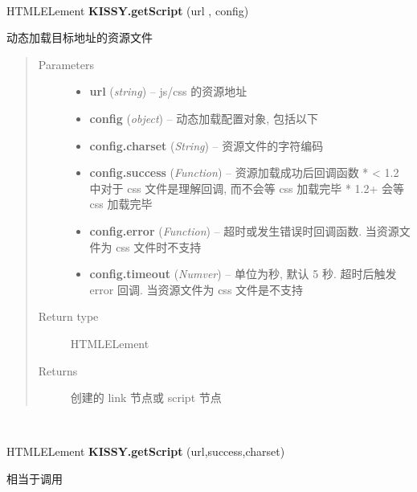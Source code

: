 \documentclass[letterpaper,10pt,english]{sphinxmanual}
\begin{document}
\begin{fulllineitems}
\label{api/seed/loader/getScript:Loader.KISSY.getScript}~
\begin{DUlineblock}{0em}
\item[] HTMLELement \textbf{KISSY.getScript} (url , config)
\item[] 动态加载目标地址的资源文件
\end{DUlineblock}
\begin{quote}\begin{description}
\item[{Parameters}] \leavevmode\begin{itemize}
\item {}
\textbf{url} (\emph{string}) -- js/css 的资源地址

\item {}
\textbf{config} (\emph{object}) -- 动态加载配置对象, 包括以下

\item {}
\textbf{config.charset} (\emph{String}) -- 资源文件的字符编码

\item {}
\textbf{config.success} (\emph{Function}) -- 资源加载成功后回调函数
* \textless{} 1.2 中对于 css 文件是理解回调, 而不会等 css 加载完毕
* 1.2+ 会等 css 加载完毕

\item {}
\textbf{config.error} (\emph{Function}) -- 超时或发生错误时回调函数. 当资源文件为 css 文件时不支持

\item {}
\textbf{config.timeout} (\emph{Numver}) -- 单位为秒, 默认 5 秒. 超时后触发 error 回调. 当资源文件为 css 文件是不支持

\end{itemize}

\item[{Return type}] \leavevmode
HTMLELement

\item[{Returns}] \leavevmode
创建的 link 节点或 script 节点

\end{description}\end{quote}

\end{fulllineitems}



\begin{fulllineitems}
~
\begin{DUlineblock}{0em}
\item[] HTMLELement \textbf{KISSY.getScript} (url,success,charset)
\end{DUlineblock}

相当于调用 

\end{fulllineitems}
\end{document}
